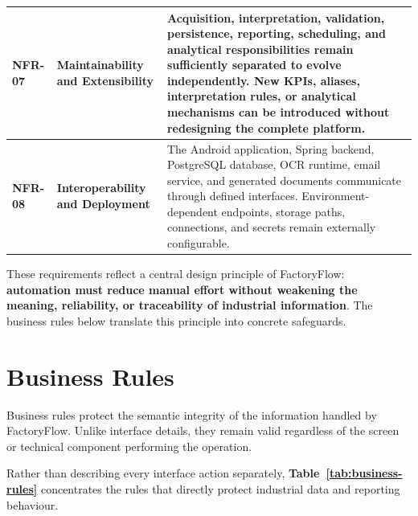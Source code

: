 \begin{longtable}{
    |>{\centering\arraybackslash\bfseries}p{}
    |>{\raggedright\arraybackslash\bfseries}p{}
    |>{\raggedright\arraybackslash}p{}|
}
NFR-07
&
Maintainability and Extensibility
&
Acquisition, interpretation, validation, persistence, reporting, scheduling,
and analytical responsibilities remain sufficiently separated to evolve
independently. New KPIs, aliases, interpretation rules, or analytical
mechanisms can be introduced without redesigning the complete platform.
\\
\hline

NFR-08
&
Interoperability and Deployment
&
The Android application, Spring backend, PostgreSQL database, OCR runtime,
email service, and generated documents communicate through defined
interfaces. Environment-dependent endpoints, storage paths, connections, and
secrets remain externally configurable.
\\
\hline

\end{longtable}

These requirements reflect a central design principle of FactoryFlow:
\textbf{automation must reduce manual effort without weakening the meaning,
reliability, or traceability of industrial information}. The business rules
below translate this principle into concrete safeguards.



\section{Business Rules}
\label{sec:business-rules}

Business rules protect the semantic integrity of the information handled by
FactoryFlow. Unlike interface details, they remain valid regardless of the
screen or technical component performing the operation.

Rather than describing every interface action separately,
\textbf{Table~\ref{tab:business-rules}} concentrates the rules that directly
protect industrial data and reporting behaviour.

